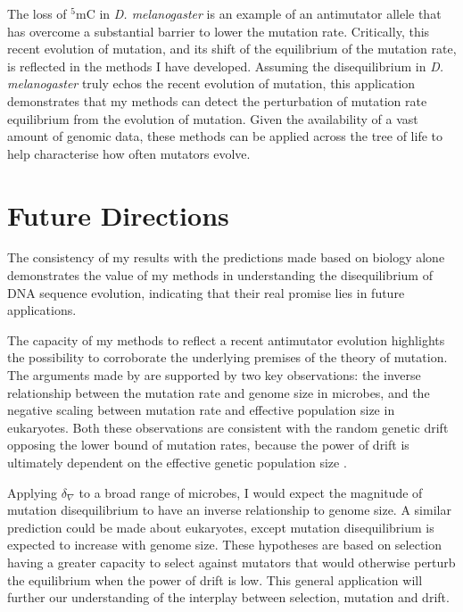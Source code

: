 The loss of $^5$mC in \textit{D. melanogaster} is an example of an antimutator allele that has overcome a substantial barrier to lower the mutation rate. Critically, this recent evolution of mutation, and its shift of the equilibrium of the mutation rate, is reflected in the methods I have developed. Assuming the disequilibrium in \textit{D. melanogaster} truly echos the recent evolution of mutation, this application demonstrates that my methods can detect the perturbation of mutation rate equilibrium from the evolution of mutation. Given the availability of a vast amount of genomic data, these methods can be applied across the tree of life to help characterise how often mutators evolve. 

\section{Future Directions}

The consistency of my results with the predictions made based on biology alone demonstrates the value of my methods in understanding the disequilibrium of DNA sequence evolution, indicating that their real promise lies in future applications.

The capacity of my methods to reflect a recent antimutator evolution highlights the possibility to corroborate the underlying premises of the theory of mutation. The arguments made by \cite{Lynch2008TheEvolution, Lynch2010EvolutionRate} are supported by two key observations: the inverse relationship between the mutation rate and genome size in microbes, and the negative scaling between mutation rate and effective population size in eukaryotes. Both these observations are consistent with the random genetic drift opposing the lower bound of mutation rates, because the power of drift is ultimately dependent on the effective genetic population size \citep{Lynch2008TheEvolution, Lynch2010EvolutionRate}. 

Applying $\delta_\nabla$ to a broad range of microbes, I would expect the magnitude of mutation disequilibrium to have an inverse relationship to genome size. A similar prediction could be made about eukaryotes, except mutation disequilibrium is expected to increase with genome size. These hypotheses are based on selection having a greater capacity to select against mutators that would otherwise perturb the equilibrium when the power of drift is low. This general application will further our understanding of the interplay between selection, mutation and drift. 

